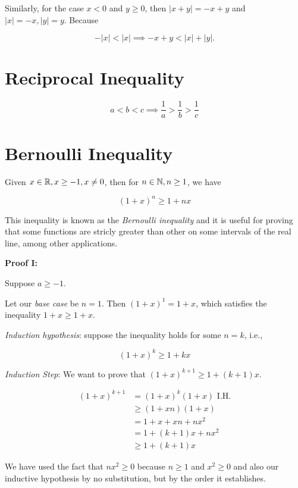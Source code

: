 Similarly, for the case \(x < 0\) and \(y \ge 0\), then \(|x + y| = -x + y\) and \(|x| = -x, |y| = y\). Because

\[
	-|x| < |x| \implies -x + y < |x| + |y|.
\]

\QED

\section{Reciprocal Inequality}

\[
	a < b < c \implies \frac{1}{a} > \frac{1}{b} > \frac{1}{c}
\]

\section{Bernoulli Inequality}

Given \(x \in \mathbb{R}, x \ge -1, x \ne 0\), then for \(n \in \mathbb{N}, n \ge 1\), we have

\[
	(1 + x)^n \ge 1 + nx
\]

This inequality is known as the \emph{Bernoulli inequality} and it is useful for proving that some functions are stricly greater than other
on some intervals of the real line, among other applications.

\textbf{Proof I:}

Suppose \(a \ge -1\).

Let our \emph{base case} be \(n = 1\). Then \((1 + x)^1 = 1 + x\), which satisfies the inequality \(1 + x \ge 1 + x\).

\emph{Induction hypothesis}: suppose the inequality holds for some \(n = k\), i.e.,

\[
	(1 + x)^k \ge 1 + kx
\]

\emph{Induction Step}: We want to prove that \((1 + x)^{k + 1} \ge 1 + (k  + 1)x\).

\begin{align*}
	(1 + x)^{k + 1} & = (1 + x)^k (1 + x) \text{ I.H.} \\
	                & \ge (1 + xn)(1 + x)              \\
	                & = 1 + x + xn + nx^2              \\
	                & = 1 + (k + 1)x + nx^2            \\
	                & \ge 1 + (k + 1)x
\end{align*}

We have used the fact that \(nx^2 \ge 0\) because \(n \ge 1\) and \(x^2 \ge 0\) and also our inductive hypothesis by no
substitution, but by the order it establishes.

